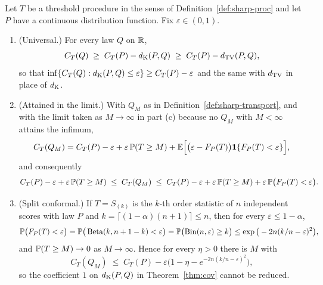 \documentclass[../../../main.tex]{subfiles}
\begin{document}
\begin{theorem}\label{thm:sharp}
Let $T$ be a threshold procedure in the sense of Definition~\ref{def:sharp-proc} and let $P$ have a continuous distribution function. Fix $\varepsilon\in(0,1)$.
\begin{enumerate}[nosep,label=(\alph*)]
\item (Universal.) For every law $Q$ on $\mathbb{R}$,
\[
C_T(Q)\;\ge\;C_T(P)-d_{\mathrm{K}}(P,Q)\;\ge\;C_T(P)-d_{\mathrm{TV}}(P,Q),
\]
so that $\inf\{C_T(Q):d_{\mathrm{K}}(P,Q)\le\varepsilon\}\ge C_T(P)-\varepsilon$ and the same with $d_{\mathrm{TV}}$ in place of $d_{\mathrm{K}}$.
\item (Attained in the limit.) With $Q_M$ as in Definition~\ref{def:sharp-transport}, and with the limit taken as $M\to\infty$ in part (c) because no $Q_M$ with $M<\infty$ attains the infimum,
\begin{equation}\label{eq:sharp-identity}
C_T(Q_M)=C_T(P)-\varepsilon+\varepsilon\,\mathbb{P}(T\ge M)+\mathbb{E}\Big[\big(\varepsilon-F_P(T)\big)\mathbf{1}\{F_P(T)<\varepsilon\}\Big],
\end{equation}
and consequently
\begin{equation}\label{eq:sharp-bound}
C_T(P)-\varepsilon+\varepsilon\,\mathbb{P}(T\ge M)\;\le\;C_T(Q_M)\;\le\;C_T(P)-\varepsilon+\varepsilon\,\mathbb{P}(T\ge M)+\varepsilon\,\mathbb{P}\big(F_P(T)<\varepsilon\big).
\end{equation}
\item (Split conformal.) If $T=S_{(k)}$ is the $k$-th order statistic of $n$ independent scores with law $P$ and $k=\lceil(1-\alpha)(n+1)\rceil\le n$, then for every $\varepsilon\le 1-\alpha$,
\[
\mathbb{P}\big(F_P(T)<\varepsilon\big)=\mathbb{P}\big(\operatorname{Beta}(k,n+1-k)<\varepsilon\big)=\mathbb{P}\big(\mathrm{Bin}(n,\varepsilon)\ge k\big)\le\exp\big(-2n(k/n-\varepsilon)^2\big),
\]
and $\mathbb{P}(T\ge M)\to0$ as $M\to\infty$. Hence for every $\eta>0$ there is $M$ with
\[
C_T(Q_M)\;\le\;C_T(P)-\varepsilon\Big(1-\eta-e^{-2n(k/n-\varepsilon)^2}\Big),
\]
so the coefficient $1$ on $d_{\mathrm{K}}(P,Q)$ in Theorem~\ref{thm:cov} cannot be reduced.
\end{enumerate}
\end{theorem}
\end{document}
